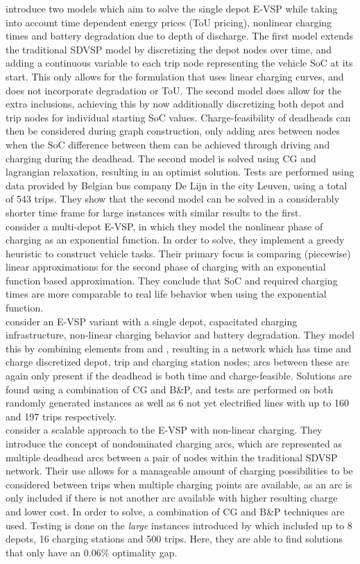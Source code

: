 \documentclass[]{article}
\begin{document}
 introduce two models which aim to solve the single depot E-VSP while taking into account time dependent energy prices (ToU pricing), nonlinear charging times and battery degradation due to depth of discharge. The first model extends the traditional SDVSP model by discretizing the depot nodes over time, and adding a continuous variable to each trip node representing the vehicle SoC at its start. This only allows for the formulation that uses linear charging curves, and does not incorporate degradation or ToU. The second model does allow for the extra inclusions, achieving this by now additionally discretizing both depot and trip nodes for individual starting SoC values. Charge-feasibility of deadheads can then be considered during graph construction, only adding arcs between nodes when the SoC difference between them can be achieved through driving and charging during the deadhead. The second model is solved using CG and lagrangian relaxation, resulting in an optimist solution. Tests are performed using data provided by Belgian bus company De Lijn in the city Leuven, using a total of 543 trips. They show that the second model can be solved in a considerably shorter time frame for large instances with similar results to the first. \\  
\citet{Olsen2020} consider a multi-depot E-VSP, in which they model the nonlinear phase of charging as an exponential function. In order to solve, they implement a greedy heuristic to construct vehicle tasks. Their primary focus is comparing (piecewise) linear approximations for the second phase of charging with an exponential function based approximation. They conclude that SoC and required charging times are more comparable to real life behavior when using the exponential function. \\
\citet{Zhang2021} consider an E-VSP variant with a single depot, capacitated charging infrastructure, non-linear charging behavior and battery degradation. They model this by combining elements from \citet{Li2014} and \citet{vanKootenNiekerk2017}, resulting in a network which has time and charge discretized depot, trip and charging station nodes; arcs between these are again only present if the deadhead is both time and charge-feasible. Solutions are found using a combination of CG and B\&P, and tests are performed on both randomly generated instances as well as 6 not yet electrified lines with up to 160 and 197 trips respectively. \\
\citet{Parmentier2023} consider a scalable approach to the E-VSP with non-linear charging. They introduce the concept of nondominated charging arcs, which are represented as multiple deadhead arcs between a pair of nodes within the traditional SDVSP network. Their use allows for a manageable amount of charging possibilities to be considered between trips when multiple charging points are available, as an arc is only included if there is not another arc available with higher resulting charge and lower cost. In order to solve, a combination of CG and B\&P techniques are used. Testing is done on the \textit{large} instances introduced by \citet{Wen2016} which included up to 8 depots, 16 charging stations and 500 trips. Here, they are able to find solutions that only have an 0.06\% optimality gap. \\
\end{document}
